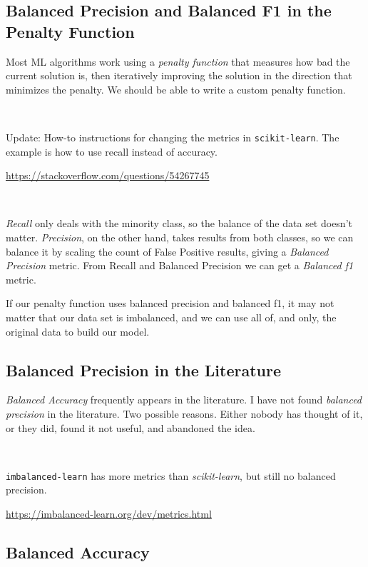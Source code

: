 \subsection{Balanced Precision and Balanced F1 in the Penalty Function}

Most ML algorithms work using a {\it penalty function} that measures how bad the current solution is, then iteratively improving the solution in the direction that minimizes the penalty.  We should be able to write a custom penalty function.  

\

Update:  How-to instructions for changing the metrics in {\tt scikit-learn}.  The example is how to use recall instead of accuracy.  

\url{https://stackoverflow.com/questions/54267745}


\

{\it Recall} only deals with the minority class, so the balance of the data set doesn't matter.  {\it Precision}, on the other hand, takes results from both classes, so we can balance it by scaling the count of False Positive results, giving a {\it Balanced Precision} metric.  From Recall and Balanced Precision we can get a {\it Balanced f1} metric.  

If our penalty function uses balanced precision and balanced f1, it may not matter that our data set is imbalanced, and we can use all of, and only, the original data to build our model.  

\subsection{Balanced Precision in the Literature}

{\it Balanced Accuracy} frequently appears in the literature.  I have not found {\it balanced precision} in the literature.  Two possible reasons.  Either nobody has thought of it, or they did, found it not useful, and abandoned the idea.

\

{\tt imbalanced-learn} has more metrics than {\it scikit-learn}, but still no balanced precision.  

\url{https://imbalanced-learn.org/dev/metrics.html}



\subsection{Balanced Accuracy}

